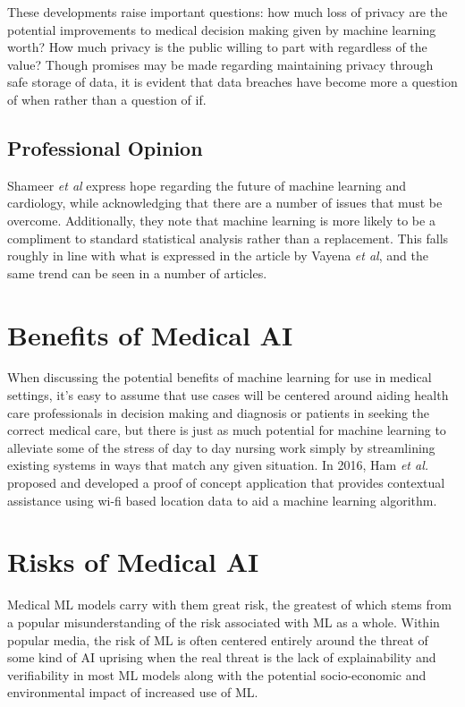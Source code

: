 \documentclass[]{article}
\begin{document}
			These developments raise important questions: how much loss of privacy are the potential improvements to medical decision making given by machine learning worth? How much privacy is the public willing to part with regardless of the value? Though promises may be made regarding maintaining privacy through safe storage of data, it is evident that data breaches have become more a question of when rather than a question of if.

		\subsection{Professional Opinion}

			Shameer \emph{et al} express hope regarding the future of machine learning and cardiology, while acknowledging that there are a number of issues that must be overcome. Additionally, they note that machine learning is more likely to be a compliment to standard statistical analysis rather than a replacement.\cite{Shameer1156} This falls roughly in line with what is expressed in the article by Vayena \emph{et al}\cite{Vayena2018}, and the same trend can be seen in a number of articles.\cite{Shah2018,WU201868}

	\section{Benefits of Medical AI}

		When discussing the potential benefits of machine learning for use in medical settings, it's easy to assume that use cases will be centered around aiding health care professionals in decision making and diagnosis or patients in seeking the correct medical care, but there is just as much potential for machine learning to alleviate some of the stress of day to day nursing work simply by streamlining existing systems in ways that match any given situation. In 2016, Ham \emph{et al.} proposed and developed a proof of concept application that provides contextual assistance using wi-fi based location data to aid a machine learning algorithm.\cite{Ham2017}

	\section{Risks of Medical AI}
		Medical ML models carry with them great risk, the greatest of which stems from a popular misunderstanding of the risk associated with ML as a whole. Within popular media, the risk of ML is often centered entirely around the threat of some kind of AI uprising when the real threat is the lack of explainability and verifiability in most ML models along with the potential socio-economic and environmental impact of increased use of ML.\cite{bbc2016rroai,emerj2019roawrtiwwa}
\end{document}
